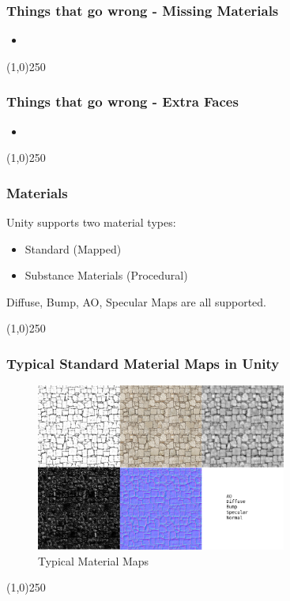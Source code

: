 \begin{frame}
\frametitle{Things that go wrong - Missing Materials}
\begin{figure}
	\centering
	\caption[]{}
	\label{fig:}
\end{figure}
\begin{itemize}
	\item 
\end{itemize}
\end{frame}
\begin{center}\line(1,0){250}\end{center}



\begin{frame}
\frametitle{Things that go wrong - Extra Faces}
\begin{figure}
	\centering
	\caption[]{}
	\label{fig:}
\end{figure}
\begin{itemize}
	\item 
\end{itemize}
\end{frame}
\begin{center}\line(1,0){250}\end{center}


\begin{frame}
\frametitle{Materials}
Unity supports two material types:
\begin{itemize}
	\item Standard (Mapped)
	\item Substance Materials (Procedural)
\end{itemize}
Diffuse, Bump, AO, Specular Maps are all supported.
\end{frame}
\begin{center}\line(1,0){250}\end{center}


\begin{frame}
\frametitle{Typical Standard Material Maps in Unity}
\begin{figure}
	\centering
	\includegraphics[height=5.5cm]{./img/Unity/Materials.jpg}
	\caption[Typical Material Maps]{Typical Material Maps}
	\label{fig:}
\end{figure}
\end{frame}
\begin{center}\line(1,0){250}\end{center}




